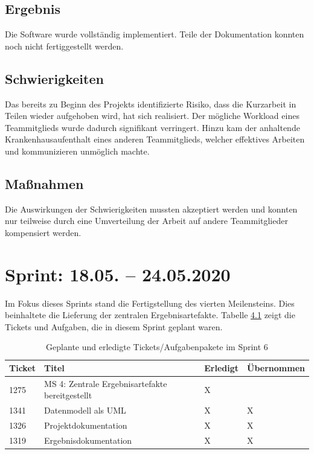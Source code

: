 \documentclass[a4paper,11pt,listof=numbered,glossary=totoc,parskip=half,toc=bib]{scrreprt}
\begin{document}
    \section{Ergebnis}
	Die Software wurde vollständig implementiert. Teile der Dokumentation konnten noch nicht fertiggestellt werden.   
    
    \section{Schwierigkeiten}
    Das bereits zu Beginn des Projekts identifizierte Risiko, dass die Kurzarbeit in Teilen wieder aufgehoben wird, hat sich realisiert. Der mögliche Workload eines Teammitglieds wurde dadurch signifikant verringert. Hinzu kam der anhaltende Krankenhausaufenthalt eines anderen Teammitglieds, welcher effektives Arbeiten und kommunizieren unmöglich machte.
    
    \section{Maßnahmen}
    Die Auswirkungen der Schwierigkeiten mussten akzeptiert werden und konnten nur teilweise durch eine Umverteilung der Arbeit auf andere Teammitglieder kompensiert werden.
    
    \chapter{Sprint: 18.05. – 24.05.2020}
    
    Im Fokus dieses Sprints stand die Fertigstellung des vierten Meilensteins. Dies beinhaltete die Lieferung der zentralen Ergebnisartefakte. Tabelle \ref{tab:sprint6} zeigt die Tickets und Aufgaben, die in diesem Sprint geplant waren.
    
\begin{table}    
    \begin{tabularx}{\textwidth}{lXll}
			\toprule
			\textbf{Ticket} & \textbf{Titel} & \textbf{Erledigt} & \textbf{Übernommen} \\
			\midrule
1275	&	MS 4: Zentrale Ergebnisartefakte bereitgestellt	&	X	&		\\
1341	&	Datenmodell als UML	&	X	&	X	\\
1326	&	Projektdokumentation	&	X	&	X	\\
1319	&	Ergebnisdokumentation	&	X	&	X	\\

			\bottomrule
		\end{tabularx}
\caption{Geplante und erledigte Tickets/Aufgabenpakete im Sprint 6}
\label{tab:sprint6}
\end{table}
    
\end{document}
